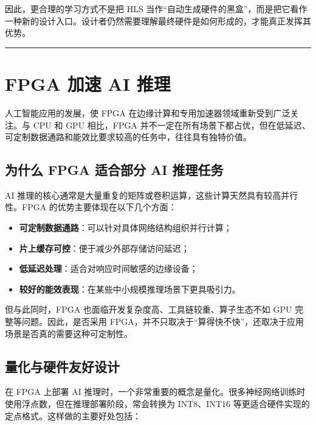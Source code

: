 因此，更合理的学习方式不是把 HLS
当作``自动生成硬件的黑盒''，而是把它看作一种新的设计入口。设计者仍然需要理解最终硬件是如何形成的，才能真正发挥其优势。

\begin{center}\rule{0.5\linewidth}{0.5pt}\end{center}

\section{FPGA 加速 AI 推理}\label{fpga-ux52a0ux901f-ai-ux63a8ux7406}

人工智能应用的发展，使 FPGA
在边缘计算和专用加速器领域重新受到广泛关注。与 CPU 和 GPU 相比，FPGA
并不一定在所有场景下都占优，但在低延迟、可定制数据通路和能效比要求较高的任务中，往往具有独特价值。

\subsection{为什么 FPGA 适合部分 AI
推理任务}\label{ux4e3aux4ec0ux4e48-fpga-ux9002ux5408ux90e8ux5206-ai-ux63a8ux7406ux4efbux52a1}

AI
推理的核心通常是大量重复的矩阵或卷积运算，这些计算天然具有较高并行性。FPGA
的优势主要体现在以下几个方面：

\begin{itemize}
\tightlist
\item
  \textbf{可定制数据通路}：可以针对具体网络结构组织并行计算；
\item
  \textbf{片上缓存可控}：便于减少外部存储访问延迟；
\item
  \textbf{低延迟处理}：适合对响应时间敏感的边缘设备；
\item
  \textbf{较好的能效表现}：在某些中小规模推理场景下更具吸引力。
\end{itemize}

但与此同时，FPGA 也面临开发复杂度高、工具链较重、算子生态不如 GPU
完整等问题。因此，是否采用
FPGA，并不只取决于``算得快不快''，还取决于应用场景是否真的需要这种可定制性。

\subsection{量化与硬件友好设计}\label{ux91cfux5316ux4e0eux786cux4ef6ux53cbux597dux8bbeux8ba1}

在 FPGA 上部署 AI
推理时，一个非常重要的概念是量化。很多神经网络训练时使用浮点数，但在推理部署阶段，常会转换为
INT8、INT16 等更适合硬件实现的定点格式。这样做的主要好处包括：

